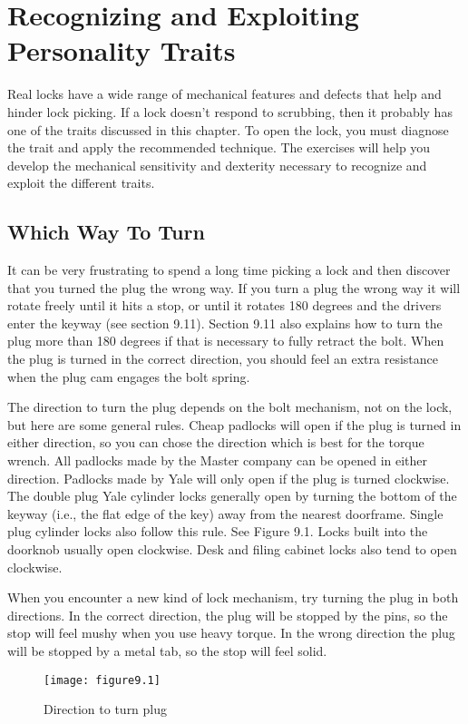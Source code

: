 \chapter{Recognizing and Exploiting Personality Traits}
Real locks have a wide range of mechanical features and defects that help and hinder lock
picking. If a lock doesn't respond to scrubbing, then it probably has one of the traits
discussed in this chapter. To open the lock, you must diagnose the trait and apply the
recommended technique. The exercises will help you develop the mechanical sensitivity and
dexterity necessary to recognize and exploit the different traits.

\section{Which Way To Turn}
It can be very frustrating to spend a long time picking a lock and then discover that you
turned the plug the wrong way. If you turn a plug the wrong way it will rotate freely until it
hits a stop, or until it rotates 180 degrees and the drivers enter the keyway (see section 9.11).
Section 9.11 also explains how to turn the plug more than 180 degrees if that is necessary
to fully retract the bolt. When the plug is turned in the correct direction, you should feel
an extra resistance when the plug cam engages the bolt spring.

The direction to turn the plug depends on the bolt mechanism, not on the lock, but here
are some general rules. Cheap padlocks will open if the plug is turned in either direction, so
you can chose the direction which is best for the torque wrench. All padlocks made by the
Master company can be opened in either direction. Padlocks made by Yale will only open if
the plug is turned clockwise. The double plug Yale cylinder locks generally open by turning
the bottom of the keyway (i.e., the flat edge of the key) away from the nearest doorframe.
Single plug cylinder locks also follow this rule. See Figure 9.1. Locks built into the doorknob
usually open clockwise. Desk and filing cabinet locks also tend to open clockwise.

When you encounter a new kind of lock mechanism, try turning the plug in both directions. In the correct direction, the plug will be stopped by the pins, so the stop will feel
mushy when you use heavy torque. In the wrong direction the plug will be stopped by a
metal tab, so the stop will feel solid.

\begin{figure}
    \texttt{[image: figure9.1]}
    \caption{Direction to turn plug}
\end{figure}

